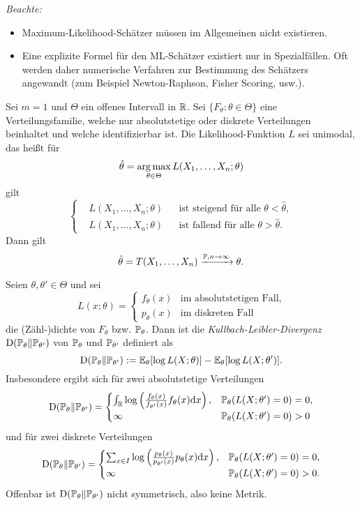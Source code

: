\emph{Beachte:}
\begin{itemize}
\item Maximum-Likelihood-Schätzer müssen im Allgemeinen nicht existieren.
\item Eine explizite Formel für den ML-Schätzer existiert nur in Spezialfällen.
  Oft werden daher numerische Verfahren zur Bestimmung des Schätzers angewandt
  (zum Beispiel Newton-Raphson, Fisher Scoring, usw.).
\end{itemize}

\begin{thm} %
  Sei $m = 1$ und $\Theta$ ein offenes Intervall in $\mathbb{R}$. Sei $\{ F_\theta:
  \theta \in \Theta \}$ eine Verteilungsfamilie, welche nur absolutstetige oder
  diskrete Verteilungen beinhaltet und welche identifizierbar ist. Die
  Likelihood-Funktion $L$ sei unimodal, das heißt für
  \[ \hat{\theta} = \operatorname*{arg\,max}_{\theta \in \Theta} L(X_1, \ldots, X_n; \theta) \]
  gilt
  \[ \left\{ \begin{aligned}
        &L(X_1, \ldots, X_n; \theta) & &\text{ist steigend für alle } \theta
        < \hat{\theta}, \\
        &L(X_1, \ldots, X_n; \theta) & &\text{ist fallend für alle } \theta
        > \hat{\theta}.
      \end{aligned}
    \right.
  \]
  Dann gilt
  \[ \hat{\theta} = T(X_1, \ldots, X_n) \xrightarrow{\mathbb{P}, n \to \infty}
    \theta. \]
\end{thm}

\begin{defn} %
  Seien $\theta, \theta' \in \Theta$ und sei
  \[ L(x; \theta) = \begin{cases}
      f_\theta(x) &\text{im absolutstetigen Fall,} \\
      p_\theta(x) &\text{im diskreten Fall}
    \end{cases}
  \]
  die (Zähl-)dichte von $F_\theta$ bzw. $\mathbb{P}_\theta$. Dann ist die
  \emph{Kullbach-Leibler-Divergenz} $\operatorname*{D}( \mathbb{P}_\theta \| \mathbb{P}_{\theta'} )$ von
  $\mathbb{P}_\theta$ und $\mathbb{P}_{\theta'}$ definiert als
  \[ \operatorname*{D}( \mathbb{P}_\theta \| \mathbb{P}_{\theta'} ) := \mathbb{E}_\theta [ \log L(X; \theta) ] -
    \mathbb{E}_\theta[ \log L(X; \theta' )]. \]
  Insbesondere ergibt sich für zwei absolutstetige Verteilungen
  \[ \operatorname*{D}( \mathbb{P}_\theta \| \mathbb{P}_{\theta'} ) =
    \begin{cases}
      \int_{\mathbb{R}} \log \left( \frac{f_\theta(x)}{f_{\theta'}(x)} f_\theta(x)
        \mathrm{d} x \right), &\mathbb{P}_\theta( L(X; \theta') = 0 ) = 0, \\
      \infty & \mathbb{P}_\theta( L(X; \theta') = 0 ) > 0
    \end{cases}
  \]
  und für zwei diskrete Verteilungen
  \[ \operatorname*{D}( \mathbb{P}_\theta \| \mathbb{P}_{\theta'} ) =
    \begin{cases}
      \sum_{x \in I} \log \left( \frac{p_\theta(x)}{p_{\theta'}(x)} p_\theta(x)
        \mathrm{d} x \right), &\mathbb{P}_\theta( L(X; \theta') = 0 ) = 0, \\
      \infty & \mathbb{P}_\theta( L(X; \theta') = 0 ) > 0.
    \end{cases}
  \]
  Offenbar ist $\operatorname*{D}( \mathbb{P}_\theta \| \mathbb{P}_{\theta'} )$ nicht symmetrisch, also keine
  Metrik.
\end{defn}

